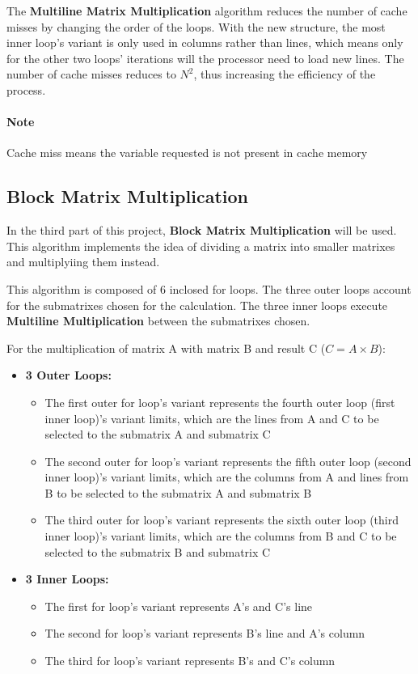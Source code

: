The \textbf{Multiline Matrix Multiplication} algorithm reduces the number of cache misses by changing the order of the loops. With the new structure, the most inner loop's variant is only used in columns rather than lines, which means only for the other two loops' iterations will the processor need to load new lines. The number of cache misses reduces to $N^2$, thus increasing the efficiency of the process.

\paragraph{Note} Cache miss means the variable requested is not present in cache memory


\subsection{Block Matrix Multiplication}
In the third part of this project, \textbf{Block Matrix Multiplication} will be used. This algorithm implements the idea of dividing a matrix into smaller matrixes and multiplyiing them instead. 

This algorithm is composed of 6 inclosed for loops. The three outer loops account for the submatrixes chosen for the calculation. The three inner loops execute \textbf{Multiline Multiplication} between the submatrixes chosen.

For the multiplication of matrix A with matrix B and result C ($C = A \times B$):

\begin{itemize}
    \item \textbf{3 Outer Loops:}
    \begin{itemize}
        \item The first outer for loop's variant represents the fourth outer loop (first inner loop)'s variant limits, which are the lines from A and C to be selected to the submatrix A and submatrix C
        \item The second outer for loop's variant represents the fifth outer loop (second inner loop)'s variant limits, which are the columns from A and lines from B to be selected to the submatrix A and submatrix B
        \item The third outer for loop's variant represents the sixth outer loop (third inner loop)'s variant limits, which are the columns from B and C to be selected to the submatrix B and submatrix C
    \end{itemize}
    \item \textbf{3 Inner Loops:}
    \begin{itemize}
        \item The first for loop's variant represents A's and C's line
        \item The second for loop's variant represents B's line and A's column
        \item The third for loop's variant represents B's and C's column
    \end{itemize}
\end{itemize}


